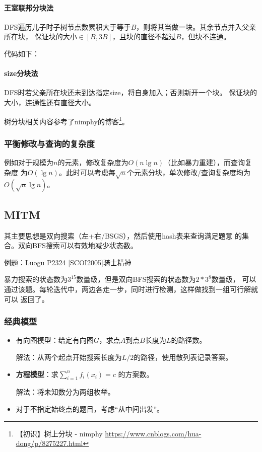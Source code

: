 \paragraph{王室联邦分块法}
DFS遍历儿子时子树节点数累积大于等于$B$，则将其当做一块。其余节点并入父亲所在块，
保证块的大小$\in [B,3B]$，且块的直径不超过$B$，但块不连通。

代码如下：

\paragraph{size分块法}
DFS时若父亲所在块还未到达指定size，将自身加入；否则新开一个块。
保证块的大小，连通性还有直径大小。

树分块相关内容参考了nimphy的博客\footnote{
	【初识】树上分块 - nimphy
	\url{https://www.cnblogs.com/hua-dong/p/8275227.html}
}。
\subsubsection{平衡修改与查询的复杂度}
例如对于规模为$n$的元素，修改复杂度为$O(n\lg n)$（比如暴力重建），而查询复杂度
为$O(\lg n)$。此时可以考虑每$\sqrt{n}$个元素分块，单次修改/查询复杂度均为
$O(\sqrt{n}\lg n)$。
\subsection{MITM}
其主要思想是双向搜索（左+右/BSGS），然后使用hash表来查询满足题意
的集合。双向BFS搜索可以有效地减少状态数。

例题：Luogu P2324 [SCOI2005]骑士精神

暴力搜索的状态数为$3^{15}$数量级，但是双向BFS搜索的状态数为$2*3^8$数量级，
可以通过该题。每轮迭代中，两边各走一步，同时进行检测，这样做找到一组可行解就可以
返回了。
\subsubsection{经典模型}
\begin{itemize}
	\item 有向图模型：给定有向图$G$，求点$A$到点$B$长度为$L$的路径数。

	解法：从两个起点开始搜索长度为$L/2$的路径，使用散列表记录答案。
	\item {\bfseries 方程模型}：求$\displaystyle \sum_{i=1}^n{f_i(x_i)}=c$
	的方案数。

	解法：将未知数分为两组枚举。
	\item 对于不指定始终点的题目，考虑``从中间出发''。
\end{itemize}

